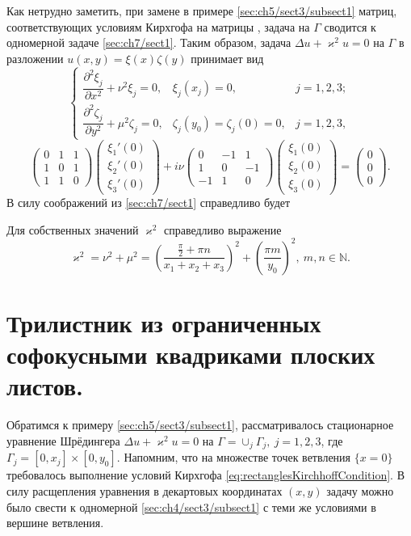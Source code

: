 Как нетрудно заметить, при замене в примере \ref{sec:ch5/sect3/subsect1} матриц, соответствующих условиям Кирхгофа на матрицы \label{eq:quantumBookCondition1D}, задача на $\Gamma$ сводится к одномерной задаче \ref{sec:ch7/sect1}.
Таким образом, задача $\Delta u + \varkappa^2 u = 0$ на $\Gamma$ в разложении $u(x,y) = \xi(x) \zeta(y)$ принимает вид
\begin{equation}
\left\{
\begin{array}{lll}
\dfrac{\partial^2 \xi_j}{\partial x^2}  + \nu^2 \xi_j = 0 , & \xi_j(x_j) = 0, & j=1,2,3; 	\\
\dfrac{\partial^2 \zeta_j}{\partial y^2}  + \mu^2 \zeta_j = 0 , & \zeta_j(y_0) = \zeta_j(0) = 0, & j=1,2,3,
\end{array}
\right.
\end{equation}
\begin{equation}
\begin{pmatrix}
0	&	1	&	1	\\
1	&	0	&	1	\\
1	&	1	&	0	

\end{pmatrix}
\begin{pmatrix}
\xi_1' (0) \\
\xi_2' (0) \\
\xi_3' (0)
\end{pmatrix} 
+ i \nu
\begin{pmatrix}
0	&	-1	&	1	\\
1	&	0	&	-1	\\
-1	&	1	&	0	
\end{pmatrix} 
\begin{pmatrix}
\xi_1(0) \\
\xi_2(0) \\
\xi_3(0) 
\end{pmatrix} = 
\begin{pmatrix}
0	\\	0	\\	0
\end{pmatrix}.
\label{eq:rectanglesBookCondition2D}
\end{equation}
В силу соображений из \ref{sec:ch7/sect1} справедливо будет
\begin{statement}
Для собственных значений $\varkappa^2$ справедливо выражение
$$\varkappa^2 = \nu^2+\mu^2 = \left( \frac{\frac{\pi}{2} + \pi n}{x_1+x_2+x_3} \right)^2 + \left( \frac{\pi m}{y_0} \right)^2, \ m,n \in \mathbb{N}.$$
\end{statement}

\section{Трилистник из ограниченных софокусными квадриками плоских листов.}\label{sec:ch7/sect2/subsect2}
Обратимся к примеру \ref{sec:ch5/sect3/subsect1}, рассматривалось стационарное уравнение Шрёдингера $\Delta u + \varkappa^2 u = 0$ на $\Gamma = \cup_j \Gamma_j, \ j=1,2,3$, где $\Gamma_j= [0,x_j] \times [0,y_0]$. 
Напомним, что на множестве точек ветвления $\{x=0\}$ требовалось выполнение условий Кирхгофа \eqref{eq:rectanglesKirchhoffCondition}. 
В силу расщепления уравнения в декартовых координатах $(x,y)$ задачу можно было свести к одномерной \ref{sec:ch4/sect3/subsect1} с теми же условиями в вершине ветвления. 

